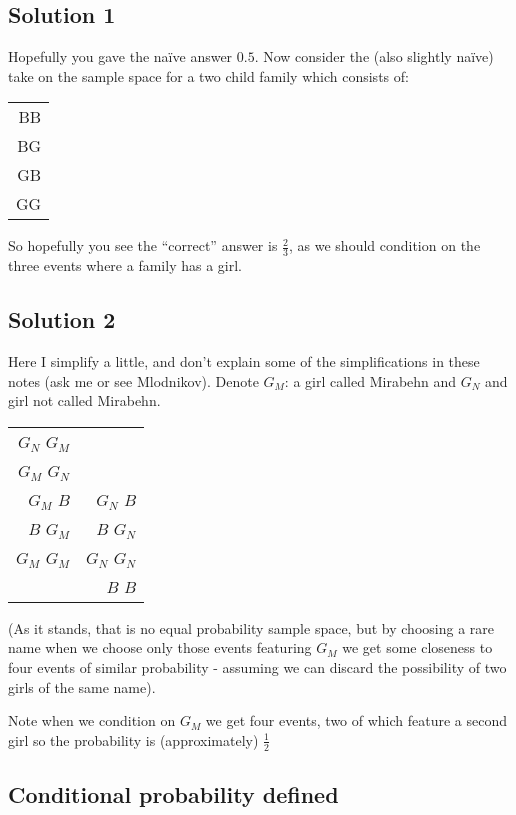 \documentclass[12pt]{extbook}
\begin{document}
 

\subsection{Solution 1}

Hopefully you gave the na\"ive answer $0.5$.   Now consider the (also slightly na\"ive) take on the sample space for a two child family which consists of:

\begin{tabular}{r}
BB \\
{\color{red}BG} \\
{\color{red}GB}\\
{\color{red}GG}
\end{tabular}

So hopefully you see the ``correct'' answer is $\frac{2}{3}$, as we should condition on the three events where a family has a girl.

 

\subsection{Solution 2}

Here I simplify a little, and don't explain some of the simplifications in these notes (ask me or see Mlodnikov).   Denote $G_M$: a girl called Mirabehn and $G_N$ and girl not called Mirabehn.

\begin{tabular}{rr}
$G_N$ $G_M$ &  \\
$G_M$ $G_N$ &  \\
$G_M$ $B$   & $G_N$ $B$ \\
$B$ $G_M$  & $B$ $G_N$ \\
$G_M$ $G_M$ & $G_N$ $G_N$\\
 & $B$ $B$ \\
\end{tabular}

(As it stands, that is no equal probability sample space, but by choosing a rare name when we choose only those events featuring $G_M$ we get some closeness to four events of similar probability - assuming we can discard the possibility of two girls of the same name).   

Note when we condition on $G_M$ we get four events, two of which feature a second girl so the probability is (approximately) $\frac{1}{2}$

  

\subsection{Conditional probability defined}
\end{document}

